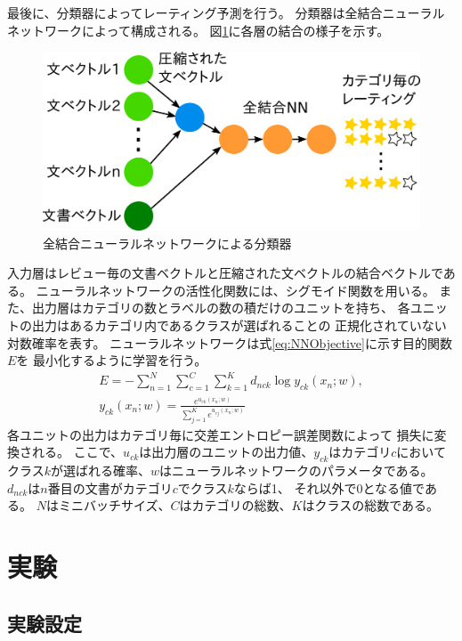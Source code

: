 \documentclass[twocolumn,a4paper]{ltjarticle}
\makeatletter
\let\tti@includegraphics\includegraphics
\renewcommand{\includegraphics}[1]{%
    \tti@includegraphics[width=\linewidth]{#1}}
\makeatother
\begin{document}
最後に、分類器によってレーティング予測を行う。
分類器は全結合ニューラルネットワークによって構成される。
図\ref{fig:MyModel}に各層の結合の様子を示す。
\begin{figure}[t!]
  \includegraphics{fig/model.png}
  \caption{全結合ニューラルネットワークによる分類器}
  \label{fig:MyModel}
\end{figure}
入力層はレビュー毎の文書ベクトルと圧縮された文ベクトルの結合ベクトルである。
ニューラルネットワークの活性化関数には、シグモイド関数を用いる。
また、出力層はカテゴリの数とラベルの数の積だけのユニットを持ち、
各ユニットの出力はあるカテゴリ内であるクラスが選ばれることの
正規化されていない対数確率を表す。
ニューラルネットワークは式\ref{eq:NNObjective}に示す目的関数$E$を
最小化するように学習を行う。
\begin{gather}
  E = - \sum^{N}_{n = 1} \sum^{C}_{c = 1} \sum^{K}_{k = 1}
        d_{nck} \log{y_{ck}(x_n; w)},
  \label{eq:NNObjective} \\
  y_{ck}(x_n; w) = \frac{e^{u_{ck}(x_n; w)}}
                        {\sum^{K}_{j = 1} e^{u_{cj}(x_n; w)}} \nonumber
\end{gather}
各ユニットの出力はカテゴリ毎に交差エントロピー誤差関数によって
損失に変換される。
ここで、$u_{ck}$は出力層のユニットの出力値、$y_{ck}$はカテゴリ$c$において
クラス$k$が選ばれる確率、$w$はニューラルネットワークのパラメータである。
$d_{nck}$は$n$番目の文書がカテゴリ$c$でクラス$k$ならば1、
それ以外で0となる値である。
$N$はミニバッチサイズ、$C$はカテゴリの総数、$K$はクラスの総数である。


\section{実験}

\subsection{実験設定}
\end{document}
